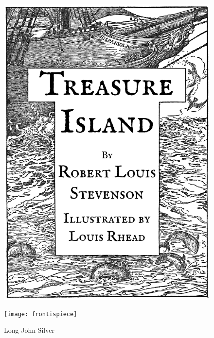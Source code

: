 \documentclass[
paper=5.5in:8.5in,
BCOR=7mm,
twoside,
DIV=calc,
12pt,
usegeometry,
chapterprefix,
headings=big]{scrbook} %
\begin{document}
\renewcommand*{\chaptermarkformat}{}
\renewcommand*{\chapterheadendvskip}{\vspace{10pt}}
\renewcommand*{\chapterheadstartvskip}{\vspace{0pt}}

\frontmatter
\pagestyle{empty}

  \recalctypearea
 \vfill
 \begin{figure}[p!]
\centering
\includegraphics[width=\linewidth]{titlepage}
\end{figure}
\vfill
\thispagestyle{empty}

\clearpage
{}
 \vfill
 \begin{figure}[p!]
\centering
\texttt{[image: frontispiece]}
\caption[\textbf{Frontispiece: Long John Silver}]{Long John Silver}
\end{figure}
\vfill
\thispagestyle{empty}
\end{document}
